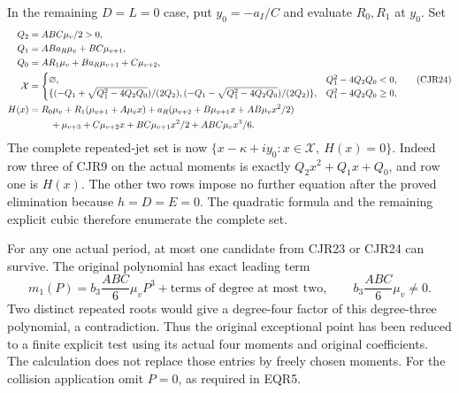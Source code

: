 In the remaining $D=L=0$ case, put $y_0=-a_I/C$ and evaluate
$R_0,R_1$ at $y_0$. Set
\[
\begin{split}
 Q_2&=ABC\mu_v/2>0,\\
 Q_1&=ABa_R\mu_v+BC\mu_{v+1},\\
 Q_0&=AR_1\mu_v+Ba_R\mu_{v+1}+C\mu_{v+2},\\
 \mathcal X&=\begin{cases}
 \varnothing,&Q_1^2-4Q_2Q_0<0,\\
 \{(-Q_1+\sqrt{Q_1^2-4Q_2Q_0})/(2Q_2),
   (-Q_1-\sqrt{Q_1^2-4Q_2Q_0})/(2Q_2)\},&Q_1^2-4Q_2Q_0\ge0,
 \end{cases}\\
 H(x)&=R_0\mu_v+R_1(\mu_{v+1}+A\mu_vx)
       +a_R(\mu_{v+2}+B\mu_{v+1}x+AB\mu_vx^2/2)\\
 &\hspace{8mm}+\mu_{v+3}+C\mu_{v+2}x+
                 BC\mu_{v+1}x^2/2+ABC\mu_vx^3/6.
\end{split}\tag{CJR24}
\]
The complete repeated-jet set is now
$\{x-\kappa+iy_0:x\in\mathcal X,\ H(x)=0\}$.
Indeed row three of CJR9 on the actual moments is exactly
$Q_2x^2+Q_1x+Q_0$, and row one is $H(x)$.
The other two rows impose no further equation after the proved
elimination because $h=D=E=0$. The quadratic formula and the
remaining explicit cubic therefore enumerate the complete set.

For any one actual period, at most one candidate from CJR23 or
CJR24 can survive. The original polynomial has exact leading term
\[
 m_1(P)=b_3\frac{ABC}{6}\mu_vP^3+
                         \text{terms of degree at most two},
 \qquad b_3\frac{ABC}{6}\mu_v\ne0.
 \tag{CJR25}
\]
Two distinct repeated roots would give a degree-four factor of
this degree-three polynomial, a contradiction. Thus the original
exceptional point has been reduced to a finite explicit test using
its actual four moments and original coefficients. The calculation
does not replace those entries by freely chosen moments. For the
collision application omit $P=0$, as required in EQR5.

